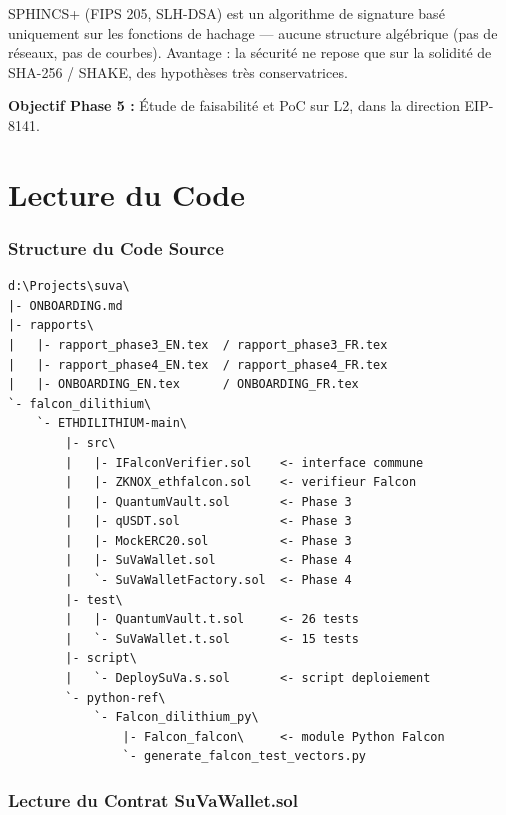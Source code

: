 \documentclass[11pt,a4paper]{article}
\begin{document}
SPHINCS+ (FIPS 205, SLH-DSA) est un algorithme de signature basé uniquement sur les fonctions de hachage --- aucune structure algébrique (pas de réseaux, pas de courbes). Avantage : la sécurité ne repose que sur la solidité de SHA-256 / SHAKE, des hypothèses très conservatrices.

\textbf{Objectif Phase 5 :} Étude de faisabilité et PoC sur L2, dans la direction EIP-8141.

\newpage
\part{Lecture du Code}

\section{Structure du Code Source}

\begin{lstlisting}
d:\Projects\suva\
|- ONBOARDING.md
|- rapports\
|   |- rapport_phase3_EN.tex  / rapport_phase3_FR.tex
|   |- rapport_phase4_EN.tex  / rapport_phase4_FR.tex
|   |- ONBOARDING_EN.tex      / ONBOARDING_FR.tex
`- falcon_dilithium\
    `- ETHDILITHIUM-main\
        |- src\
        |   |- IFalconVerifier.sol    <- interface commune
        |   |- ZKNOX_ethfalcon.sol    <- verifieur Falcon
        |   |- QuantumVault.sol       <- Phase 3
        |   |- qUSDT.sol              <- Phase 3
        |   |- MockERC20.sol          <- Phase 3
        |   |- SuVaWallet.sol         <- Phase 4
        |   `- SuVaWalletFactory.sol  <- Phase 4
        |- test\
        |   |- QuantumVault.t.sol     <- 26 tests
        |   `- SuVaWallet.t.sol       <- 15 tests
        |- script\
        |   `- DeploySuVa.s.sol       <- script deploiement
        `- python-ref\
            `- Falcon_dilithium_py\
                |- Falcon_falcon\     <- module Python Falcon
                `- generate_falcon_test_vectors.py
\end{lstlisting}

\section{Lecture du Contrat SuVaWallet.sol}
\end{document}
